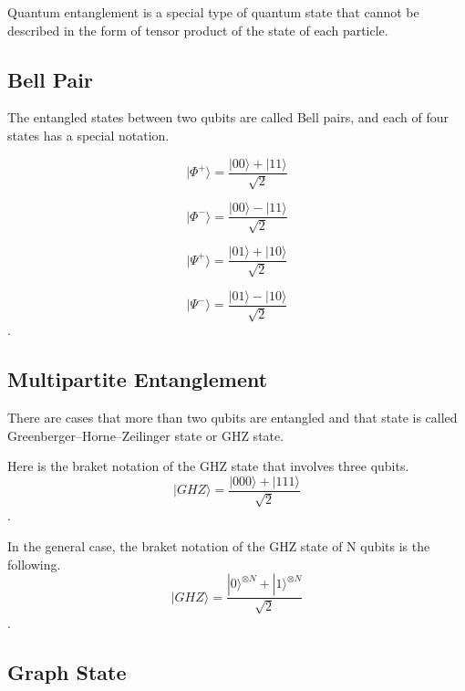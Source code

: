 Quantum entanglement is a special type of quantum state that cannot be described in the form of tensor product of the state of each particle.

\subsection{Bell Pair}
The entangled states between two qubits are called Bell pairs, and each of four states has a special notation.

\begin{equation}
  |\Phi^+\rangle = \frac{|00\rangle + |11\rangle}{\sqrt{2}}
  \end{equation}
  
  \begin{equation}
 |\Phi^-\rangle = \frac{|00\rangle - |11\rangle}{\sqrt{2}}
 \end{equation}
 
 \begin{equation}
 |\Psi^+\rangle = \frac{|01\rangle + |10\rangle}{\sqrt{2}}
 \end{equation}
 
 \begin{equation}
  |\Psi^-\rangle = \frac{|01\rangle - |10\rangle}{\sqrt{2}}
  \end{equation}.

\subsection{Multipartite Entanglement}
There are cases that more than two qubits are entangled and that state is called Greenberger–Horne–Zeilinger state or GHZ state.

Here is the braket notation of the GHZ state that involves three qubits.
\begin{equation}
  |GHZ\rangle = \frac{|000\rangle + |111\rangle}{\sqrt{2}}
\end{equation}.

In the general case, the braket notation of the GHZ state of N qubits is the following.
\begin{equation}
  |GHZ\rangle = \frac{|0\rangle^{\otimes N} + |1\rangle^{\otimes N}}{\sqrt{2}}
\end{equation}.

\subsection{Graph State}

